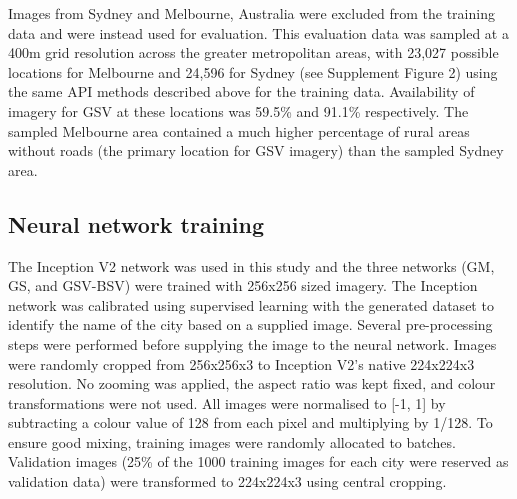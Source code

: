 \documentclass[Crown,sageh,times]{sagej}
\begin{document}





Images from Sydney and Melbourne, Australia were excluded from the training data and were instead used for evaluation. This evaluation data was sampled at a 400m grid resolution across the greater metropolitan areas, with 23,027 possible locations for Melbourne and 24,596 for Sydney (see Supplement Figure 2) using the same API methods described above for the training data. Availability of imagery for GSV at these locations was 59.5\% and 91.1\% respectively. The sampled Melbourne area contained a much higher percentage of rural areas without roads (the primary location for GSV imagery) than the sampled Sydney area.





\subsection{Neural network training}\label{sec:methods4}    

The Inception V2 network was used in this study and the three networks (GM, GS, and GSV-BSV) were trained with 256x256 sized imagery. The Inception network was calibrated using supervised learning with the generated dataset to identify the name of the city based on a supplied image. Several pre-processing steps were performed before supplying the image to the neural network. Images were randomly cropped from 256x256x3 to Inception V2's native 224x224x3 resolution. No zooming was applied, the aspect ratio was kept fixed, and colour transformations were not used. All images were normalised to [-1, 1] by subtracting a colour value of 128 from each pixel and multiplying by 1/128. To ensure good mixing, training images were randomly allocated to batches. Validation images (25\% of the 1000 training images for each city were reserved as validation data) were transformed to 224x224x3 using central cropping.
\end{document}
